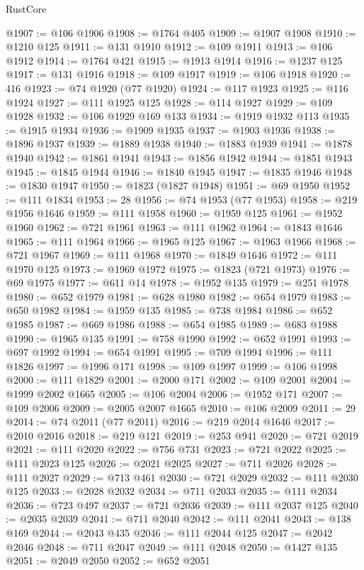 \begin{lexlean}{RustCore}
\begin{coremodule}
@1907 := @106 @1906
@1908 := @1764 @405
@1909 := @1907 @1908
@1910 := @1210 @125
@1911 := @131 @1910
@1912 := @109 @1911
@1913 := @106 @1912
@1914 := @1764 @421
@1915 := @1913 @1914
@1916 := @1237 @125
@1917 := @131 @1916
@1918 := @109 @1917
@1919 := @106 @1918
@1920 := 416
@1923 := @74 @1920 (@77 @1920)
@1924 := @117 @1923
@1925 := @116 @1924
@1927 := @111 @1925 @125
@1928 := @114 @1927
@1929 := @109 @1928
@1932 := @106 @1929 @169 @133
@1934 := @1919 @1932 @113
@1935 := @1915 @1934
@1936 := @1909 @1935
@1937 := @1903 @1936
@1938 := @1896 @1937
@1939 := @1889 @1938
@1940 := @1883 @1939
@1941 := @1878 @1940
@1942 := @1861 @1941
@1943 := @1856 @1942
@1944 := @1851 @1943
@1945 := @1845 @1944
@1946 := @1840 @1945
@1947 := @1835 @1946
@1948 := @1830 @1947
@1950 := @1823 (@1827 @1948)
@1951 := @69 @1950
@1952 := @111 @1834
@1953 := 28
@1956 := @74 @1953 (@77 @1953)
@1958 := @219 @1956 @1646
@1959 := @111 @1958
@1960 := @1959 @125
@1961 := @1952 @1960
@1962 := @721 @1961
@1963 := @111 @1962
@1964 := @1843 @1646
@1965 := @111 @1964
@1966 := @1965 @125
@1967 := @1963 @1966
@1968 := @721 @1967
@1969 := @111 @1968
@1970 := @1849 @1646
@1972 := @111 @1970 @125
@1973 := @1969 @1972
@1975 := @1823 (@721 @1973)
@1976 := @69 @1975
@1977 := @611 @14
@1978 := @1952 @135
@1979 := @251 @1978
@1980 := @652 @1979
@1981 := @628 @1980
@1982 := @654 @1979
@1983 := @650 @1982
@1984 := @1959 @135
@1985 := @738 @1984
@1986 := @652 @1985
@1987 := @669 @1986
@1988 := @654 @1985
@1989 := @683 @1988
@1990 := @1965 @135
@1991 := @758 @1990
@1992 := @652 @1991
@1993 := @697 @1992
@1994 := @654 @1991
@1995 := @709 @1994
@1996 := @111 @1826
@1997 := @1996 @171
@1998 := @109 @1997
@1999 := @106 @1998
@2000 := @111 @1829
@2001 := @2000 @171
@2002 := @109 @2001
@2004 := @1999 @2002 @1665
@2005 := @106 @2004
@2006 := @1952 @171
@2007 := @109 @2006
@2009 := @2005 @2007 @1665
@2010 := @106 @2009
@2011 := 29
@2014 := @74 @2011 (@77 @2011)
@2016 := @219 @2014 @1646
@2017 := @2010 @2016
@2018 := @219 @121
@2019 := @253 @941
@2020 := @721 @2019
@2021 := @111 @2020
@2022 := @756 @731
@2023 := @721 @2022
@2025 := @111 @2023 @125
@2026 := @2021 @2025
@2027 := @711 @2026
@2028 := @111 @2027
@2029 := @713 @461
@2030 := @721 @2029
@2032 := @111 @2030 @125
@2033 := @2028 @2032
@2034 := @711 @2033
@2035 := @111 @2034
@2036 := @723 @497
@2037 := @721 @2036
@2039 := @111 @2037 @125
@2040 := @2035 @2039
@2041 := @711 @2040
@2042 := @111 @2041
@2043 := @138 @169
@2044 := @2043 @435
@2046 := @111 @2044 @125
@2047 := @2042 @2046
@2048 := @711 @2047
@2049 := @111 @2048
@2050 := @1427 @135
@2051 := @2049 @2050
@2052 := @652 @2051

\end{coremodule}
\end{lexlean}
